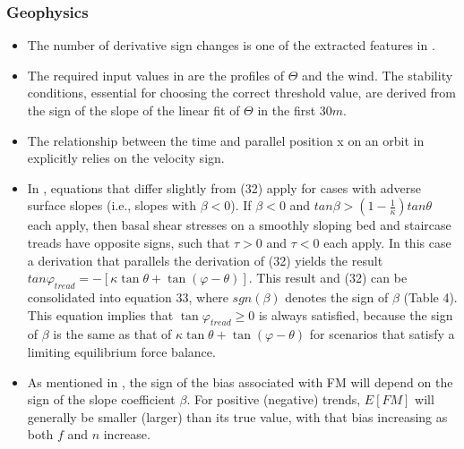 \documentclass[11pt]{book}
\begin{document}
\subsubsection{Geophysics}
\begin{itemize}
\item The number of derivative sign changes is one of the extracted features
in \cite{piretzidis2016identification}.
\item The required input values in \cite{poltera2017pathfinderturb}
are the profiles of $\Theta$ and the wind. The stability conditions,
essential for choosing the correct threshold value, are derived from
the sign of the slope of the linear fit of $\Theta$ in the first
$30m$.
\item The relationship between the time and parallel position x on an orbit
in \cite{hutchinson2018prediction}
explicitly relies on the velocity sign.
\item In \cite{iverson2019basal},
equations that differ slightly from (32) apply for cases with adverse
surface slopes (i.e., slopes with $\beta<0$). If $\beta<0$ and $tan\beta>\left(1-\frac{1}{\kappa}\right)tan\theta$
each apply, then basal shear stresses on a smoothly sloping bed and
staircase treads have opposite signs, such that $\tau>0$ and $\tau<0$
each apply. In this case a derivation that parallels the derivation
of (32) yields the result $tan\varphi_{tread}=-\left[\kappa\tan\theta+\tan\left(\varphi-\theta\right)\right]$.
This result and (32) can be consolidated into equation 33, where $sgn\left(\beta\right)$
denotes the sign of $\beta$ (Table 4). This equation implies that
$\tan\varphi_{tread}\geq0$ is always satisfied, because the sign
of $\beta$ is the same as that of $\kappa\tan\theta+\tan(\varphi-\theta)$
for scenarios that satisfy a limiting equilibrium force balance.
\item As mentioned in \cite{vogel2020comparison},
the sign of the bias associated with FM will depend on the sign of
the slope coefficient $\beta$. For positive (negative) trends, $E\left[FM\right]$
will generally be smaller (larger) than its true value, with that
bias increasing as both $f$ and $n$ increase.
\end{itemize}
\end{document}
